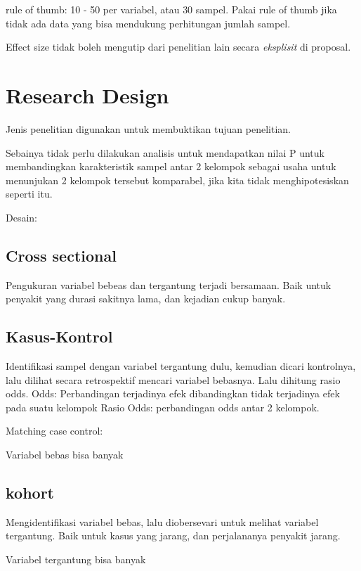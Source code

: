 \documentclass[
  letterpaper,
  DIV=11,
  numbers=noendperiod]{scrreprt}
\begin{document}
rule of thumb: 10 - 50 per variabel, atau 30 sampel. Pakai rule of thumb
jika tidak ada data yang bisa mendukung perhitungan jumlah sampel.

Effect size tidak boleh mengutip dari penelitian lain secara
\emph{eksplisit} di proposal.

\section{Research Design}\label{research-design}

Jenis penelitian digunakan untuk membuktikan tujuan penelitian.

Sebainya tidak perlu dilakukan analisis untuk mendapatkan nilai P untuk
membandingkan karakteristik sampel antar 2 kelompok sebagai usaha untuk
menunjukan 2 kelompok tersebut komparabel, jika kita tidak
menghipotesiskan seperti itu.

Desain:

\subsection{Cross sectional}\label{cross-sectional}

Pengukuran variabel bebeas dan tergantung terjadi bersamaan. Baik untuk
penyakit yang durasi sakitnya lama, dan kejadian cukup banyak.

\subsection{Kasus-Kontrol}\label{kasus-kontrol}

Identifikasi sampel dengan variabel tergantung dulu, kemudian dicari
kontrolnya, lalu dilihat secara retrospektif mencari variabel bebasnya.
Lalu dihitung rasio odds. Odds: Perbandingan terjadinya efek
dibandingkan tidak terjadinya efek pada suatu kelompok Rasio Odds:
perbandingan odds antar 2 kelompok.

Matching case control:

Variabel bebas bisa banyak

\subsection{kohort}\label{kohort}

Mengidentifikasi variabel bebas, lalu diobersevari untuk melihat
variabel tergantung. Baik untuk kasus yang jarang, dan perjalananya
penyakit jarang.

Variabel tergantung bisa banyak
\end{document}
